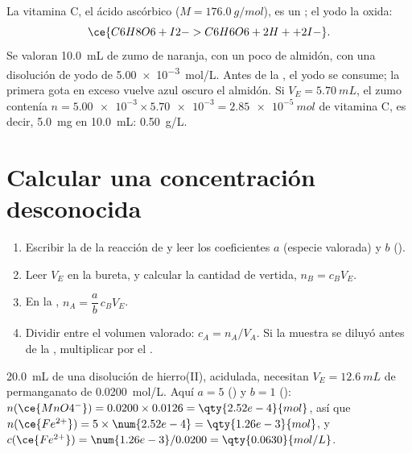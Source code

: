\begin{example}\label{ex:g11:titration:vitamin-c}
La vitamina C, el ácido ascórbico  ($M = \qty{176.0}{g/mol}$),
es un ; el yodo  la oxida:
\[
  \ce{C6H8O6 + I2 -> C6H6O6 + 2H+ + 2I-} .
\]
Se valoran \qty{10.0}{mL} de zumo de naranja, con un poco de almidón,
con una disolución de yodo de \qty{5.00e-3}{mol/L}. Antes de la
, el yodo se consume; la primera gota en exceso vuelve azul
oscuro el almidón. Si $V_E = \qty{5.70}{mL}$, el zumo contenía
$n = \num{5.00e-3} \times \num{5.70e-3} = \qty{2.85e-5}{mol}$ de vitamina
C, es decir, \qty{5.0}{mg} en \qty{10.0}{mL}: \qty{0.50}{g/L}.
\end{example}

\section{Calcular una concentración desconocida}

\begin{method}\label{met:g11:titration:computing}
\begin{enumerate}
  \item Escribir la  de la reacción de  y leer
        los coeficientes $a$ (especie valorada) y $b$ ().
  \item Leer $V_E$ en la bureta, y calcular la cantidad de 
        vertida, $n_B = c_B V_E$.
  \item En la , $n_A = \dfrac{a}{b}\, c_B V_E$.
  \item Dividir entre el volumen valorado: $c_A = n_A / V_A$. Si la
        muestra se diluyó antes de la , multiplicar por el
        .
\end{enumerate}
\end{method}

\begin{example}\label{ex:g11:titration:iron}
\qty{20.0}{mL} de una disolución de hierro(II), acidulada, necesitan
$V_E = \qty{12.6}{mL}$ de permanganato de \qty{0.0200}{mol/L}. Aquí
$a = 5$ () y $b = 1$ ():
$n(\ce{MnO4^-}) = 0.0200 \times 0.0126 = \qty{2.52e-4}{mol}$, así que
$n(\ce{Fe^{2+}}) = 5 \times \num{2.52e-4} = \qty{1.26e-3}{mol}$, y
$c(\ce{Fe^{2+}}) = \num{1.26e-3} / 0.0200 = \qty{0.0630}{mol/L}$.
\end{example}

